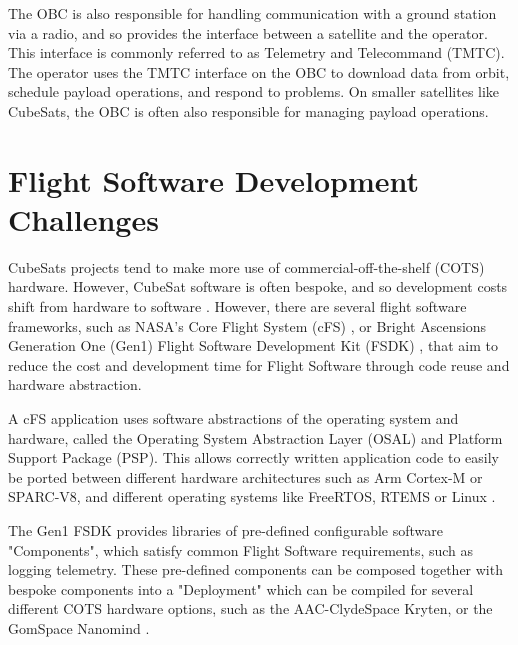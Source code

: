 \documentclass[../report.tex]{subfiles}
\begin{document}
The OBC is also responsible for handling communication with a ground station
via a radio, and so provides the interface between a satellite and the
operator. This interface is commonly referred to as Telemetry and Telecommand
(TMTC). The operator uses the TMTC interface on the OBC to download data from
orbit, schedule payload operations, and respond to problems. On smaller
satellites like CubeSats, the OBC is often also responsible for managing
payload operations.



\section{Flight Software Development Challenges}

CubeSats projects tend to make more use of commercial-off-the-shelf (COTS)
hardware. However, CubeSat software is often bespoke, and so development costs
shift from hardware to software \citep{Cubesat_Handbook_OBSW}. However, there
are several flight software frameworks, such as NASA's Core Flight System (cFS)
\citep{Nasa_cFS}, or Bright Ascensions Generation One (Gen1) Flight Software
Development Kit (FSDK) \citep{Bal_FSDK}, that aim to reduce the cost and
development time for Flight Software through code reuse and hardware
abstraction.

A cFS application uses software abstractions of the operating system and
hardware, called the Operating System Abstraction Layer (OSAL) and Platform
Support Package (PSP). This allows correctly written application code to easily
be ported between different hardware architectures such as Arm Cortex-M or
SPARC-V8, and different operating systems like FreeRTOS, RTEMS or Linux
\citep{Nasa_cFS}.

The Gen1 FSDK provides libraries of pre-defined configurable software
"Components", which satisfy common Flight Software requirements, such as
logging telemetry. These pre-defined components can be composed together with
bespoke components into a "Deployment" which can be compiled for several
different COTS hardware options, such as the AAC-ClydeSpace Kryten, or the
GomSpace Nanomind \citep{Bal_Options}.
\end{document}
